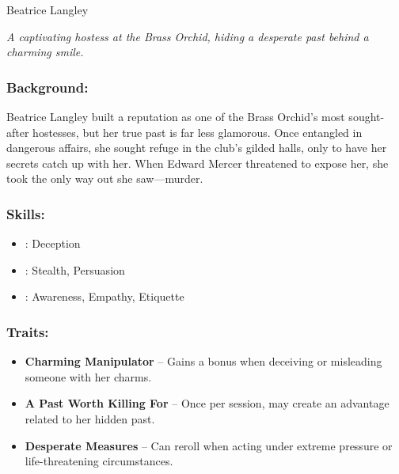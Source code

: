 \begin{WyrdFullNPC}[%
		name=Beatrice Langley,%
		description=The Orchid’s Most Enchanting Hostess,%
		float=!t%
	]{Beatrice Langley}
	
    \emph{A captivating hostess at the Brass Orchid, hiding a desperate past behind a charming smile.}
    
    \subsubsection*{Background:}
    Beatrice Langley built a reputation as one of the Brass Orchid’s most sought-after hostesses, but her true past is far less glamorous. Once entangled in dangerous affairs, she sought refuge in the club’s gilded halls, only to have her secrets catch up with her. When Edward Mercer threatened to expose her, she took the only way out she saw—murder.
    
    \subsubsection*{Skills:}
    \begin{itemize}
       \item \Expert: Deception
        \item \Skilled: Stealth, Persuasion
        \item \Novice: Awareness, Empathy, Etiquette
    \end{itemize}
    
    \subsubsection*{Traits:}
    \begin{itemize}
        \item \textbf{Charming Manipulator} – Gains a bonus when deceiving or misleading someone with her charms.
        \item \textbf{A Past Worth Killing For} – Once per session, may create an advantage related to her hidden past.
        \item \textbf{Desperate Measures} – Can reroll when acting under extreme pressure or life-threatening circumstances.
    \end{itemize}
\end{WyrdFullNPC}